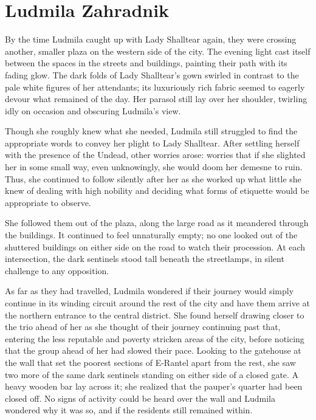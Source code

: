 \chapter{Ludmila Zahradnik}

By the time Ludmila caught up with Lady Shalltear again, they were crossing another, smaller plaza on the western side of the city. The evening light cast itself between the spaces in the streets and buildings, painting their path with its fading glow. The dark folds of Lady Shalltear’s gown swirled in contrast to the pale white figures of her attendants; its luxuriously rich fabric seemed to eagerly devour what remained of the day. Her parasol still lay over her shoulder, twirling idly on occasion and obscuring Ludmila’s view.

 

Though she roughly knew what she needed, Ludmila still struggled to find the appropriate words to convey her plight to Lady Shalltear. After settling herself with the presence of the Undead, other worries arose: worries that if she slighted her in some small way, even unknowingly, she would doom her demesne to ruin. Thus, she continued to follow silently after her as she worked up what little she knew of dealing with high nobility and deciding what forms of etiquette would be appropriate to observe.

 

She followed them out of the plaza, along the large road as it meandered through the buildings. It continued to feel unnaturally empty; no one looked out of the shuttered buildings on either side on the road to watch their procession. At each intersection, the dark sentinels stood tall beneath the streetlamps, in silent challenge to any opposition.

 

As far as they had travelled, Ludmila wondered if their journey would simply continue in its winding circuit around the rest of the city and have them arrive at the northern entrance to the central district. She found herself drawing closer to the trio ahead of her as she thought of their journey continuing past that, entering the less reputable and poverty stricken areas of the city, before noticing that the group ahead of her had slowed their pace. Looking to the gatehouse at the wall that set the poorest sections of E-Rantel apart from the rest, she saw two more of the same dark sentinels standing on either side of a closed gate. A heavy wooden bar lay across it; she realized that the pauper’s quarter had been closed off. No signs of activity could be heard over the wall and Ludmila wondered why it was so, and if the residents still remained within.

